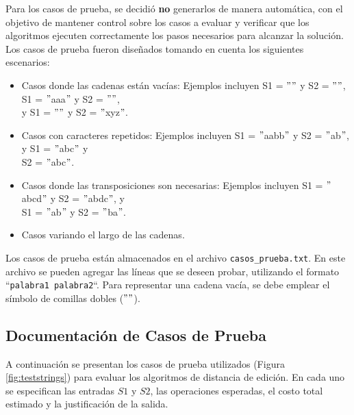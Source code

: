 Para los casos de prueba, se decidió \textbf{no} generarlos de manera automática, con el objetivo de mantener control sobre los casos a evaluar y verificar que los algoritmos ejecuten correctamente los pasos necesarios para alcanzar la solución. Los casos de prueba fueron diseñados tomando en cuenta los siguientes escenarios:

\begin{itemize} 
    \item Casos donde las cadenas están vacías: Ejemplos incluyen S1 = $""$ y S2 = $""$, S1 = $"$aaa$"$ y S2 = $""$, \\ 
    y S1 = $""$ y S2 = $"$xyz$"$. 
    \item Casos con caracteres repetidos: Ejemplos incluyen S1 = $"$aabb$"$ y S2 = $"$ab$"$, y S1 = $"$abc$"$ y \\
    S2 = $"$abc$"$. 
    \item Casos donde las transposiciones son necesarias: Ejemplos incluyen S1 = $"$abcd$"$ y S2 = $"$abdc$"$, y \\
    S1 = $"$ab$"$ y S2 = $"$ba$"$. 
    \item Casos variando el largo de las cadenas.
\end{itemize}

Los casos de prueba están almacenados en el archivo \texttt{casos\_prueba.txt}. En este archivo se pueden agregar las líneas que se deseen probar, utilizando el formato ``\texttt{palabra1 palabra2}``. Para representar una cadena vacía, se debe emplear el símbolo de comillas dobles ($""$).

\subsection{Documentación de Casos de Prueba}

A continuación se presentan los casos de prueba utilizados (Figura \ref{fig:teststrings}) para evaluar los algoritmos de distancia de edición. En cada uno se especifican las entradas \( S1 \) y \( S2 \), las operaciones esperadas, el costo total estimado y la justificación de la salida.

